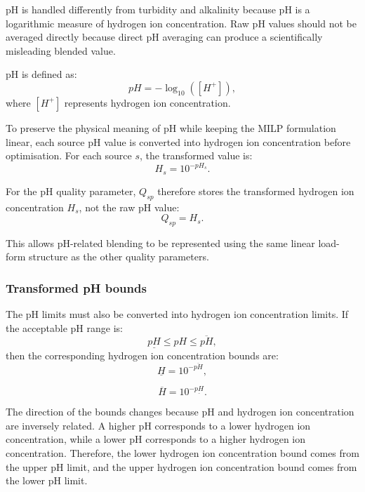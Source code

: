 \documentclass[10pt]{article}
\begin{document}
pH is handled differently from turbidity and alkalinity because pH is a
logarithmic measure of hydrogen ion concentration. Raw pH values should not be
averaged directly because direct pH averaging can produce a scientifically
misleading blended value.

pH is defined as:
\begin{equation}
    pH = -\log_{10}([H^+]),
\end{equation}
where $[H^+]$ represents hydrogen ion concentration.

To preserve the physical meaning of pH while keeping the MILP formulation
linear, each source pH value is converted into hydrogen ion concentration before
optimisation. For each source $s$, the transformed value is:
\begin{equation}
    H_s = 10^{-pH_s}.
\end{equation}

For the pH quality parameter, $Q_{sp}$ therefore stores the transformed hydrogen
ion concentration $H_s$, not the raw pH value:
\begin{equation}
    Q_{sp} = H_s.
\end{equation}

This allows pH-related blending to be represented using the same linear
load-form structure as the other quality parameters.

\subsubsection{Transformed pH bounds}

The pH limits must also be converted into hydrogen ion concentration limits. If
the acceptable pH range is:
\begin{equation}
    \underline{pH}
    \leq
    pH
    \leq
    \overline{pH},
\end{equation}
then the corresponding hydrogen ion concentration bounds are:
\begin{equation}
    \underline{H} = 10^{-\overline{pH}},
\end{equation}

\begin{equation}
    \overline{H} = 10^{-\underline{pH}}.
\end{equation}

The direction of the bounds changes because pH and hydrogen ion concentration
are inversely related. A higher pH corresponds to a lower hydrogen ion
concentration, while a lower pH corresponds to a higher hydrogen ion
concentration. Therefore, the lower hydrogen ion concentration bound comes from
the upper pH limit, and the upper hydrogen ion concentration bound comes from
the lower pH limit.
\end{document}

